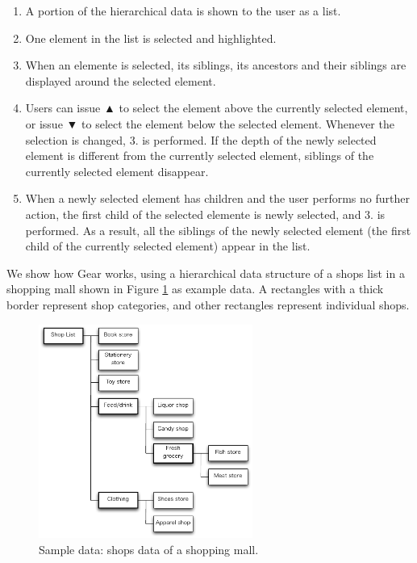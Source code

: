 \documentclass[conference]{IEEEtran}
\def\up{▲}
\def\down{▼}
\begin{document}
\begin{enumerate}
\item A portion of the hierarchical data is shown to the user as a list.

\item One element in the list is selected and highlighted.


\item When an elemente is selected, its siblings, its ancestors and their siblings are displayed
around the selected element.

\item Users can issue {\up} to select the element above the currently selected element,
or issue {\down} to select the element below the selected element.
Whenever the selection is changed, 3. is performed.
If the depth of the newly selected element is different from the currently
selected element, siblings of the currently selected element disappear.

\item When a newly selected element has children and the user performs no further action,
the first child of the selected elemente is newly selected, and 3. is performed.
As a result, all the siblings of the newly selected element
(the first child of the currently selected element) appear in the list.

\end{enumerate}

We show how Gear works, using a hierarchical data structure of
a shops list in a shopping mall shown in Figure \ref{fig1} as example data.
A rectangles with a thick border represent shop categories, and
other rectangles represent individual shops.

\begin{figure}[H]
\centerline{\includegraphics[width=70mm,bb=0 0 490 490]{figures/fig1.pdf}}
\caption{Sample data: shops data of a shopping mall.}
\label{fig1}
\end{figure}
\end{document}

